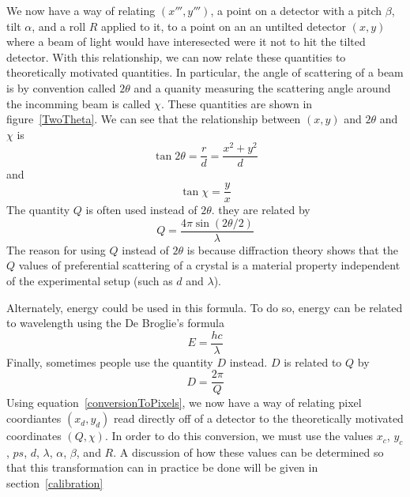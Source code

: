 \begin{SCfigure}[1][htb]
\centering

\caption{For a particular point $(x,y)$, we
alwasy associate two quantities: $2\theta$ and $\chi$.
$2\theta$ is the angle of scattering 
of the beam, or the angle that an incomming beam is 
difflected by when it diffracts off the crystal. 
$\chi$ is a measure of the azimuthal angle around 
the beam. It tells you in what direction radially 
outwards (with respect to the undeflected beam) 
the outgoing beam was was scattered.}
\label{TwoTheta}
\end{SCfigure}

We now have a way of relating $(x''',y''')$, 
a point on a detector with a pitch $\beta$, 
tilt $\alpha$, and a roll $R$ applied to it, 
to a point on an an untilted detector $(x,y)$
where a beam of light would have interesected
were it not to hit the tilted detector.
With this relationship, we can now relate
these quantities to theoretically motivated 
quantities. In particular, the angle of scattering 
of a beam is by convention called $2\theta$ and a 
quanity measuring the scattering angle around the 
incomming beam is called $\chi$. These quantities 
are shown in figure~\ref{TwoTheta}. We can see that 
the relationship between $(x,y)$ and $2\theta$ and 
$\chi$ is
\begin{equation}\label{2thetatermsr}
    \tan2\theta = \frac{r}{d} = \frac{x^2+y^2}{d}
\end{equation}
and
\begin{equation}
    \tan\chi = \frac{y}{x}
\end{equation}
The quantity $Q$ is often used instead of $2\theta$. 
they are related by
\begin{equation}\label{qterms2theta}
    Q = \frac{4\pi \sin(2\theta/2)}{\lambda}
\end{equation}
The reason for using $Q$ instead of $2\theta$ is because 
diffraction theory shows that the $Q$ values of preferential 
scattering of a crystal is a material property independent 
of the experimental setup (such as $d$ and $\lambda$). 

Alternately, energy could be used in this formula.
To do so, energy can be related to wavelength using
the De Broglie's formula
\begin{equation}
E = \frac{hc}{\lambda}
\end{equation}
Finally, sometimes people use the quantity $D$ instead.
$D$ is related to $Q$ by
\begin{equation}\label{DtermsQ}
    D = \frac{2\pi}{Q}
\end{equation}
Using equation~\ref{conversionToPixels},
we now have a way of relating pixel
coordiantes $(x_d,y_d)$ read directly off
of a detector to the
theoretically motivated coordinates $(Q,\chi)$.
In order to do this conversion, we must use
the values $x_c$, $y_c$, $ps$, $d$, $\lambda$,
$\alpha$, $\beta$, and $R$. A discussion of
how these values can be determined so that
this transformation can in practice be done
will be given in section~\ref{calibration}


